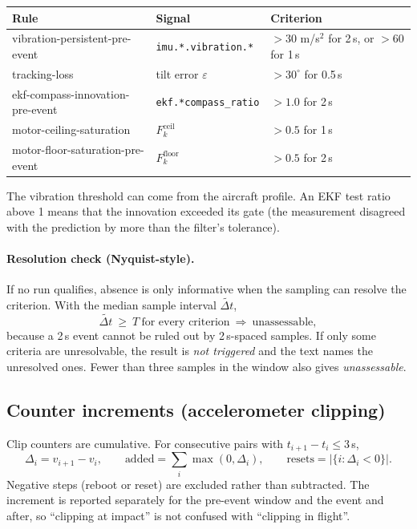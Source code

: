 \documentclass[11pt,a4paper]{article}
\newcommand{\code}[1]{\texttt{#1}}
\begin{document}
\begin{center}
\begin{tabular}{@{}lll@{}}
\toprule
Rule & Signal & Criterion \\
\midrule
vibration-persistent-pre-event & \code{imu.*.vibration.*} & $>30$ m/s$^2$ for 2\,s, or $>60$ for 1\,s \\
tracking-loss & tilt error $\varepsilon$ & $>30^\circ$ for 0.5\,s \\
ekf-compass-innovation-pre-event & \code{ekf.*compass\_ratio} & $>1.0$ for 2\,s \\
motor-ceiling-saturation & $F^{\text{ceil}}_k$ & $>0.5$ for 1\,s \\
motor-floor-saturation-pre-event & $F^{\text{floor}}_k$ & $>0.5$ for 2\,s \\
\bottomrule
\end{tabular}
\end{center}

The vibration threshold can come from the aircraft profile. An EKF test ratio above 1 means
that the innovation exceeded its gate (the measurement disagreed with the prediction by more than
the filter's tolerance).

\paragraph{Resolution check (Nyquist-style).} If no run qualifies, absence is only informative
when the sampling can resolve the criterion. With the median sample interval $\widetilde{\Delta t}$,
\[
\widetilde{\Delta t}\ \ge\ T\ \text{for every criterion}\ \Longrightarrow\ \text{unassessable},
\]
because a 2\,s event cannot be ruled out by 2\,s-spaced samples. If only some criteria are
unresolvable, the result is \emph{not triggered} and the text names the unresolved ones. Fewer than
three samples in the window also gives \emph{unassessable}.

\subsection{Counter increments (accelerometer clipping)}
Clip counters are cumulative. For consecutive pairs with $t_{i+1}-t_i\le3$\,s,
\[
\Delta_i=v_{i+1}-v_i,\qquad
\text{added}=\sum_i\max(0,\Delta_i),\qquad
\text{resets}=|\{i:\Delta_i<0\}| .
\]
Negative steps (reboot or reset) are excluded rather than subtracted. The increment is reported
separately for the pre-event window and the event and after, so ``clipping at impact'' is not
confused with ``clipping in flight''.
\end{document}
